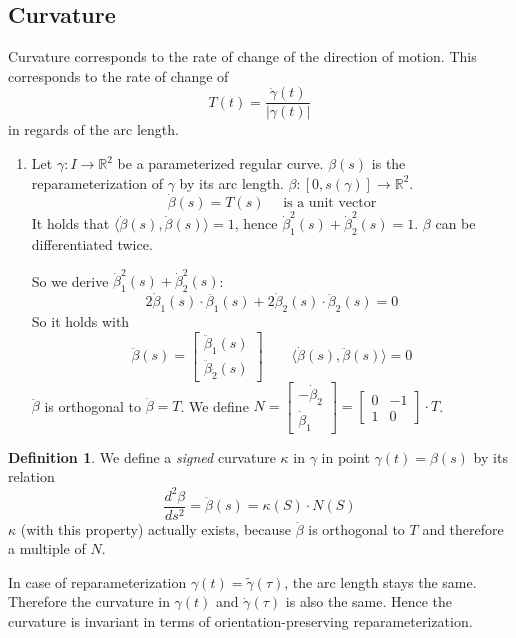 \documentclass[a4paper,landscape,twocolumn]{article}
\theoremstyle{definition}
\newtheorem{defi}{Definition}
\newcommand\abs[1]{\left|#1\right|}
\begin{document}
\subsection{Curvature}
%
Curvature corresponds to the rate of change of the direction of motion.
This corresponds to the rate of change of
\[ T(t) = \frac{\dot{\gamma}(t)}{\abs{\gamma(t)}} \]
in regards of the arc length.

\begin{enumerate}
  \item Let $\gamma: I \to \mathbb R^2$ be a parameterized regular curve.
    $\beta(s)$ is the reparameterization of $\gamma$ by its arc length.
    $\beta: [0, s(\gamma)] \to \mathbb R^2$.
    \[ \dot\beta(s) = T(s) \quad \text{ is a unit vector} \]
    It holds that $\langle \dot\beta(s), \dot\beta(s)\rangle = 1$,
    hence $\dot\beta_1^2(s) + \dot\beta_2^2(s) = 1$.
    $\beta$ can be differentiated twice.

    So we derive $\dot\beta_1^2(s) + \dot\beta_2^2(s)$:
    \[ 2\dot\beta_1(s) \cdot \ddot{\beta_1}(s) + 2 \dot\beta_2(s) \cdot \ddot{\beta}_2(s) = 0 \]
    So it holds with
    \[
      \ddot{\beta}(s) = \begin{bmatrix} \ddot{\beta}_1(s) \\ \ddot{\beta}_2(s) \end{bmatrix}
      \qquad
      \langle \dot{\beta}(s), \ddot{\beta}(s) \rangle = 0
    \]
    $\ddot{\beta}$ is orthogonal to $\dot{\beta} = T$.
    We define $N = \begin{bmatrix} -\dot{\beta}_2 \\ \dot{\beta}_1 \end{bmatrix} = \begin{bmatrix} 0 & -1 \\ 1 & 0 \end{bmatrix} \cdot T$.
\end{enumerate}

\begin{defi}
  We define a \emph{signed} curvature $\kappa$ in $\gamma$ in point $\gamma(t) = \beta(s)$
  by its relation
  \[ \frac{d^2 \beta}{ds^2} = \ddot{\beta}(s) = \kappa(S) \cdot N(S) \]
  $\kappa$ (with this property) actually exists, because $\ddot{\beta}$ is orthogonal to $T$
  and therefore a multiple of $N$.

  In case of reparameterization $\gamma(t) = \tilde{\gamma}(\tau)$, the arc length stays
  the same. Therefore the curvature in $\gamma(t)$ and $\dot{\gamma}(\tau)$ is also the same.
  Hence the curvature is invariant in terms of orientation-preserving reparameterization.
\end{defi}



\clearpage
\begin{otherlanguage}{ngerman}
\printindex[German]
\end{otherlanguage}
\printindex[English]
\end{document}
